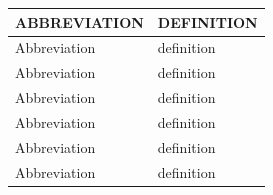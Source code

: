 \documentclass[12pt,a4paper]{article}
\begin{document}
\begin{center}
\renewcommand{\arraystretch}{1.2}

\begin{tabular}{p{4cm} p{7cm}}
\toprule
\textbf{ABBREVIATION} & \hspace{3cm}\textbf{DEFINITION} \\
\midrule

Abbreviation & \hspace{3cm} definition \\[1mm]
Abbreviation & \hspace{3cm} definition \\[1mm]
Abbreviation & \hspace{3cm} definition \\[1mm]
Abbreviation & \hspace{3cm} definition \\[1mm]
Abbreviation & \hspace{3cm} definition \\[1mm]
Abbreviation & \hspace{3cm} definition \\[1mm]

\end{tabular}
\end{center}
\end{document}
